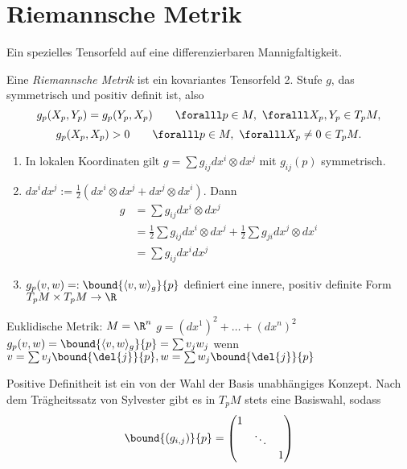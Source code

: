 \chapter{Riemannsche Metrik}

Ein spezielles Tensorfeld auf eine differenzierbaren Mannigfaltigkeit.

\begin{defn*}
	Eine \emph{Riemannsche Metrik} ist ein kovariantes Tensorfeld 2. Stufe $g$, das symmetrisch und positiv definit ist, also
	\[ g_p(X_p,Y_p) = g_p(Y_p,X_p) \qquad \foralll p \in M,\ \foralll X_p,Y_p \in T_pM, \]
	\[ g_p(X_p,X_p) > 0 \qquad \foralll p \in M,\ \foralll X_p \neq 0 \in T_pM. \]
\end{defn*}

\begin{rem*}
	\begin{enumerate}[label= {\roman*})]
		\item In lokalen Koordinaten gilt $ g = \sum g_{ij} dx^i \otimes dx^j $ mit $g_{ij}(p)$ symmetrisch.
		\item $ dx^idx^j := \frac{1}{2}(dx^i \otimes dx^j + dx^j \otimes dx^i) $. Dann
			\begin{align*}
				g &= \sum g_{ij} dx^i \otimes dx^j\\
				&= \frac{1}{2} \sum g_{ij} dx^i \otimes dx^j + \frac{1}{2} \sum g_{ji} dx^j \otimes dx^i\\
				&= \sum g_{ij} dx^idx^j
			\end{align*}
		\item $ g_p(v,w) =: \bound{\langle v,w\rangle_g}{p} $ definiert eine innere, positiv definite Form $ T_pM \times T_pM \to \R $
	\end{enumerate}
\end{rem*}

\begin{exmp*}
	Euklidische Metrik: $M = \R^n$
	$ g = (dx^1)^2 + \dots + (dx^n)^2 $
	$ g_p(v,w) = \bound{\langle v,w\rangle_g}{p} = \sum v_jw_j $ wenn $ v = \sum v_j \bound{\del{j}}{p}, w = \sum w_j \bound{\del{j}}{p}$
\end{exmp*}

\begin{rem}\label{6.1}
	Positive Definitheit ist ein von der Wahl der Basis unabhängiges Konzept. Nach dem Trägheitssatz von Sylvester gibt es in $T_pM$ stets eine Basiswahl, sodass
	\[ \bound{(g_{i,j})}{p} = \begin{pmatrix}
		1 & &\\
		& \ddots &\\
		&&1
	\end{pmatrix} \]
\end{rem}

